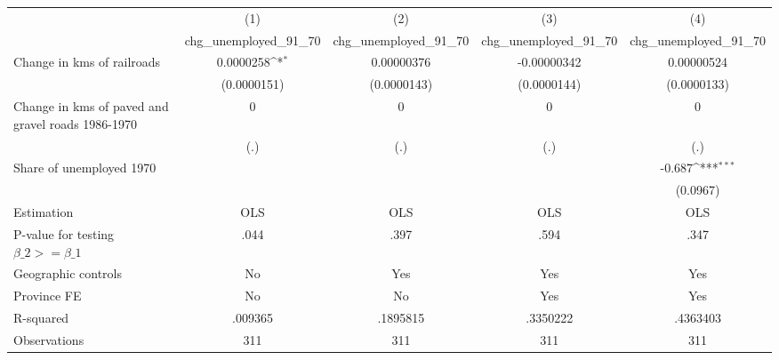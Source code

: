 {
\def\sym#1{\ifmmode^{#1}\else\(^{#1}\)\fi}
\begin{tabular}{l*{4}{c}}
\hline\hline
                &\multicolumn{1}{c}{(1)}&\multicolumn{1}{c}{(2)}&\multicolumn{1}{c}{(3)}&\multicolumn{1}{c}{(4)}\\
                &\multicolumn{1}{c}{chg\_unemployed\_91\_70}&\multicolumn{1}{c}{chg\_unemployed\_91\_70}&\multicolumn{1}{c}{chg\_unemployed\_91\_70}&\multicolumn{1}{c}{chg\_unemployed\_91\_70}\\
\hline
Change in kms of railroads&0.0000258\sym{*}  &0.00000376         &-0.00000342         &0.00000524         \\
                &(0.0000151)         &(0.0000143)         &(0.0000144)         &(0.0000133)         \\
[1em]
Change in kms of paved and gravel roads 1986-1970&        0         &        0         &        0         &        0         \\
                &      (.)         &      (.)         &      (.)         &      (.)         \\
[1em]
Share of unemployed 1970&                  &                  &                  &   -0.687\sym{***}\\
                &                  &                  &                  & (0.0967)         \\
\hline
Estimation      &      OLS         &      OLS         &      OLS         &      OLS         \\
P-value for testing $\beta\_2 >= \beta\_1$&     .044         &     .397         &     .594         &     .347         \\
Geographic controls&       No         &      Yes         &      Yes         &      Yes         \\
Province FE     &       No         &       No         &      Yes         &      Yes         \\
R-squared       &  .009365         & .1895815         & .3350222         & .4363403         \\
Observations    &      311         &      311         &      311         &      311         \\
\hline\hline
\end{tabular}
}
